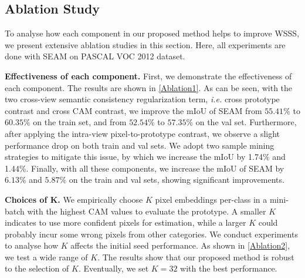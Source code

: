 \documentclass[10pt,twocolumn,letterpaper]{article}
\begin{document}
\subsection{Ablation Study}
To analyse how each component in our proposed method helps to improve WSSS, we present extensive ablation studies in this section. 
Here, all experiments are done with SEAM on PASCAL VOC 2012 dataset.

\textbf{Effectiveness of each component.} First, we demonstrate the effectiveness of each component. The results are shown in \cref{Ablation1}. As can be seen, with the two cross-view semantic consistency regularization term, \textit{i.e.} cross prototype contrast and cross CAM contrast, we improve the mIoU of SEAM from $55.41\%$ to $60.35\%$ on the train set, and from  $52.54\%$ to $57.35\%$ on the val set.
Furthermore, after applying the intra-view pixel-to-prototype contrast, we observe a slight performance drop on both train and val sets.
We adopt two sample mining strategies to mitigate this issue, by which we increase the mIoU by 1.74\% and 1.44\%.
Finally, with all these components, we increase the mIoU of SEAM by $6.13\%$ and $5.87\%$ on the train and val sets, showing significant improvements.

\textbf{Choices of $\boldsymbol{K}$.} We empirically choose $K$ pixel embeddings per-class in a mini-batch with the highest CAM values to evaluate the prototype.
A smaller $K$ indicates to use more confident pixels for estimation, while a larger $K$ could probably incur some wrong pixels from other categories. 
We conduct experiments to analyse how $K$ affects the initial seed performance.
As shown in \cref{Ablation2}, we test a wide range of $K$.
The results show that our proposed method is robust to the selection of $K$. Eventually, we set $K=32$ with the best performance.
\end{document}
